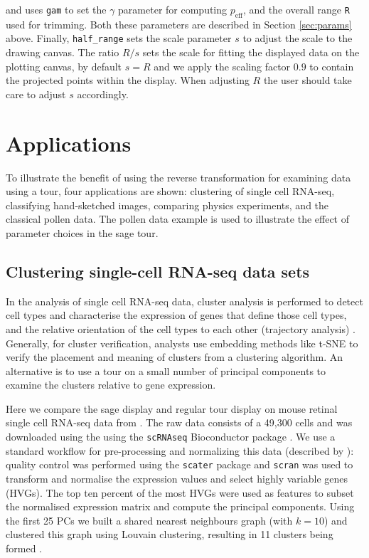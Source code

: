 \documentclass[]{interact}
\theoremstyle{plain}%
\theoremstyle{definition}
\theoremstyle{remark}
\begin{document}
\noindent and uses \texttt{gam} to set the \(\gamma\) parameter for
computing \(p_{\mathrm{eff}}\), and the overall range \texttt{R} used
for trimming. Both these parameters are described in Section
\ref{sec:params} above. Finally, \texttt{half\_range} sets the scale
parameter \(s\) to adjust the scale to the drawing canvas. The ratio
\(R/s\) sets the scale for fitting the displayed data on the plotting
canvas, by default \(s = R\) and we apply the scaling factor \(0.9\) to
contain the projected points within the display. When adjusting \(R\)
the user should take care to adjust \(s\) accordingly.

\hypertarget{sec:application}{%
\section{Applications}\label{sec:application}}

To illustrate the benefit of using the reverse transformation for
examining data using a tour, four applications are shown: clustering of
single cell RNA-seq, classifying hand-sketched images, comparing physics
experiments, and the classical pollen data. The pollen data example is
used to illustrate the effect of parameter choices in the sage tour.

\hypertarget{sec:appl1}{%
\subsection{Clustering single-cell RNA-seq data sets}\label{sec:appl1}}

In the analysis of single cell RNA-seq data, cluster analysis is
performed to detect cell types and characterise the expression of genes
that define those cell types, and the relative orientation of the cell
types to each other (trajectory analysis) \citep{Amezquita2020-at}.
Generally, for cluster verification, analysts use embedding methods like
t-SNE to verify the placement and meaning of clusters from a clustering
algorithm. An alternative is to use a tour on a small number of
principal components to examine the clusters relative to gene
expression.

Here we compare the sage display and regular tour display on mouse
retinal single cell RNA-seq data from \citet{Macosko2015-ot}. The raw
data consists of a 49,300 cells and was downloaded using the using the
\texttt{scRNAseq} Bioconductor package \citep{scRNAseq-d}. We use a
standard workflow for pre-processing and normalizing this data
(described by \citet{Amezquita2020-at}): quality control was performed
using the \texttt{scater} package \citep{McCarthy2017} and
\texttt{scran} \citep{Lun2016} was used to transform and normalise the
expression values and select highly variable genes (HVGs). The top ten
percent of the most HVGs were used as features to subset the normalised
expression matrix and compute the principal components. Using the first
25 PCs we built a shared nearest neighbours graph (with \(k = 10\)) and
clustered this graph using Louvain clustering, resulting in 11 clusters
being formed \citep{Blondel2008-bx}.
\end{document}
